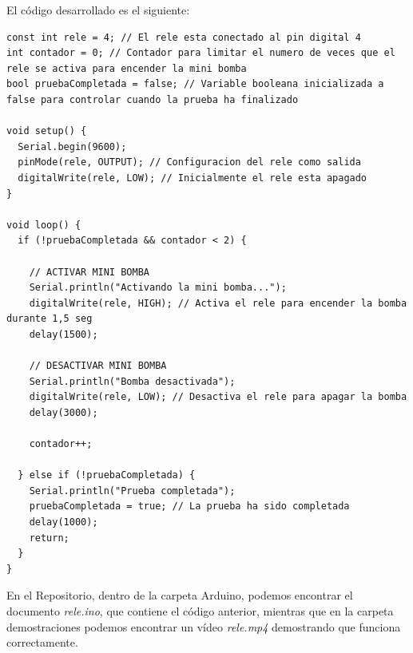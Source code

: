 El código desarrollado es el siguiente:

\begin{lstlisting}
const int rele = 4; // El rele esta conectado al pin digital 4
int contador = 0; // Contador para limitar el numero de veces que el rele se activa para encender la mini bomba
bool pruebaCompletada = false; // Variable booleana inicializada a false para controlar cuando la prueba ha finalizado

void setup() {
  Serial.begin(9600);
  pinMode(rele, OUTPUT); // Configuracion del rele como salida
  digitalWrite(rele, LOW); // Inicialmente el rele esta apagado
}

void loop() {
  if (!pruebaCompletada && contador < 2) { 

    // ACTIVAR MINI BOMBA
    Serial.println("Activando la mini bomba...");
    digitalWrite(rele, HIGH); // Activa el rele para encender la bomba durante 1,5 seg
    delay(1500); 
    
    // DESACTIVAR MINI BOMBA
    Serial.println("Bomba desactivada");
    digitalWrite(rele, LOW); // Desactiva el rele para apagar la bomba
    delay(3000);
    
    contador++;
     
  } else if (!pruebaCompletada) {
    Serial.println("Prueba completada"); 
    pruebaCompletada = true; // La prueba ha sido completada
    delay(1000); 
    return; 
  }
}
\end{lstlisting}

En el Repositorio, dentro de la carpeta Arduino, podemos encontrar el documento \textit{rele.ino}, que contiene el código anterior, mientras que en la carpeta demostraciones podemos encontrar un vídeo \textit{rele.mp4} demostrando que funciona correctamente.

